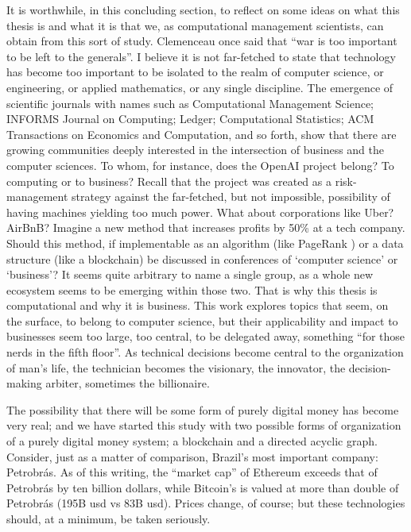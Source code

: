 It is worthwhile, in this concluding section, to reflect on some ideas on what this thesis is and what it is that we, as computational management scientists, can obtain from this sort of study.  Clemenceau once said that ``war is too important to be left to the generals''.  I believe it is not far-fetched to state that technology has become too important to be isolated to the realm of computer science, or engineering, or applied mathematics, or any single discipline.  The emergence of scientific journals with names such as Computational Management Science; INFORMS Journal on Computing; Ledger; Computational Statistics; ACM Transactions on Economics and Computation, and so forth, show that there are growing communities deeply interested in the intersection of business and the computer sciences.  To whom, for instance, does the OpenAI project belong?  To computing or to business?  Recall that the project was created as a risk-management strategy against the far-fetched, but not impossible, possibility of having machines yielding too much power.  What about corporations like Uber?  AirBnB?  Imagine a new method that increases profits by 50\% at a tech company.  Should this method, if implementable as an algorithm (like PageRank \citep{brin1998anatomy}) or a data structure (like a blockchain) be discussed in conferences of `computer science' or `business'? It seems quite arbitrary to name a single group, as a whole new ecosystem seems to be emerging within those two. That is why this thesis is computational and why it is business.  This work explores topics that seem, on the surface, to belong to computer science, but their applicability and impact to businesses seem too large, too central, to be delegated away, something ``for those nerds in the fifth floor''.  As technical decisions become central to the organization of man's life, the technician becomes the visionary, the innovator, the decision-making arbiter, sometimes the billionaire.

The possibility that there will be some form of purely digital money has become very real; and we have started this study with two possible forms of organization of a purely digital money system; a blockchain and a directed acyclic graph.  Consider, just as a matter of comparison, Brazil's most important company: Petrobrás.  As of this writing, the ``market cap'' of Ethereum exceeds that of Petrobrás by ten billion dollars, while Bitcoin's is valued at more than double of Petrobrás (195B usd vs 83B usd).  Prices change, of course; but these technologies should, at a minimum, be taken seriously.



